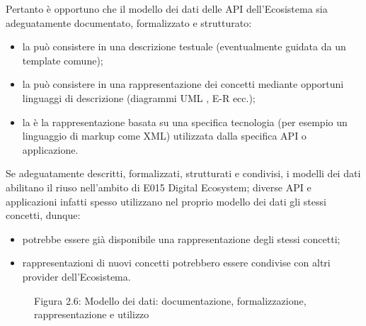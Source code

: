 \documentclass[letterpaper,10pt,italian]{sphinxmanual}
\begin{document}
Pertanto è opportuno che il modello dei dati delle API dell’Ecosistema sia adeguatamente documentato, formalizzato e strutturato:
\begin{itemize}
\item {} 
la  può consistere in una descrizione testuale (eventualmente guidata da un template comune);

\item {} 
la  può consistere in una rappresentazione dei concetti mediante opportuni linguaggi di descrizione (diagrammi UML  , E-R ecc.);

\item {} 
la  è la rappresentazione basata su una specifica tecnologia (per esempio un linguaggio di markup come XML) utilizzata dalla specifica API o applicazione.

\end{itemize}

Se adeguatamente descritti, formalizzati, strutturati e condivisi, i modelli dei dati abilitano il riuso nell’ambito di E015 Digital Ecosystem; diverse API e applicazioni infatti spesso utilizzano nel proprio modello dei dati gli stessi concetti, dunque:
\begin{itemize}
\item {} 
potrebbe essere già disponibile una rappresentazione degli stessi concetti;

\item {} 
rappresentazioni di nuovi concetti potrebbero essere condivise con altri provider dell’Ecosistema.

\end{itemize}

\begin{figure}[htbp]
\centering
\capstart

\noindent{}
\caption{Figura 2.6: Modello dei dati: documentazione, formalizzazione, rappresentazione e utilizzo}\label{\detokenize{sez23:id1}}\end{figure}
\end{document}
